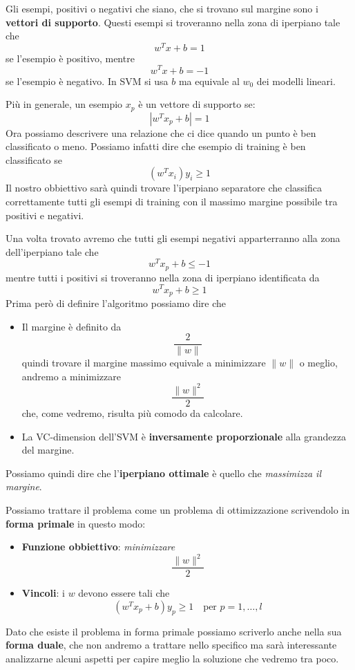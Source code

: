 Gli esempi, positivi o negativi che siano, che si trovano sul margine sono i \textbf{vettori di supporto}. Questi esempi si
troveranno nella zona di iperpiano tale che
\[ w^T x + b = 1 \]
se l'esempio \`e positivo, mentre
\[ w^T x + b = -1 \]
se l'esempio \`e negativo. In SVM si usa $b$ ma equivale al $w_0$ dei modelli lineari.

Pi\`u in generale, un esempio $x_p$ \`e un vettore di supporto se:
\[ | w^T x_p + b | = 1 \]
Ora possiamo descrivere una relazione che ci dice quando un punto \`e ben classificato o meno. Possiamo infatti dire che
esempio di training \`e ben classificato se
\[ (w^T x_i) y_i \geq 1 \]
Il nostro obbiettivo sar\`a quindi trovare l'iperpiano separatore che classifica correttamente tutti gli esempi di training
con il massimo margine possibile tra positivi e negativi.

Una volta trovato avremo che tutti gli esempi negativi apparterranno alla zona dell'iperpiano tale che
\[ w^T x_p + b \leq -1 \]
mentre tutti i positivi si troveranno nella zona di iperpiano identificata da
\[ w^T x_p + b \geq 1 \]
Prima per\`o di definire l'algoritmo possiamo dire che
\begin{itemize}
	\item Il margine \`e definito da
	      \[ \frac{2}{\| w \|} \]
	      quindi trovare il margine massimo equivale a minimizzare $\| w \|$ o meglio, andremo a minimizzare
	      \[\frac{\| w \|^2}{2}\]
	      che, come vedremo, risulta pi\`u comodo da calcolare.
	\item La VC-dimension dell'SVM \`e \textbf{inversamente proporzionale} alla grandezza del margine.
\end{itemize}
Possiamo quindi dire che l'\textbf{iperpiano ottimale} \`e quello che \emph{massimizza il margine}.

Possiamo trattare il problema come un problema di ottimizzazione scrivendolo in \textbf{forma primale} in questo modo:
\begin{itemize}
	\item \textbf{Funzione obbiettivo}: \emph{minimizzare}
	      \[ \frac{\| w \|^2}{2} \]
	\item \textbf{Vincoli}: i $w$ devono essere tali che
	      \[ (w^T x_p + b) y_p \geq 1 \quad \text{per } p = 1, \dots, l \]
\end{itemize}
Dato che esiste il problema in forma primale possiamo scriverlo anche nella sua \textbf{forma duale}, che non andremo a
trattare nello specifico ma sar\`a interessante analizzarne alcuni aspetti per capire meglio la soluzione che vedremo
tra poco.

